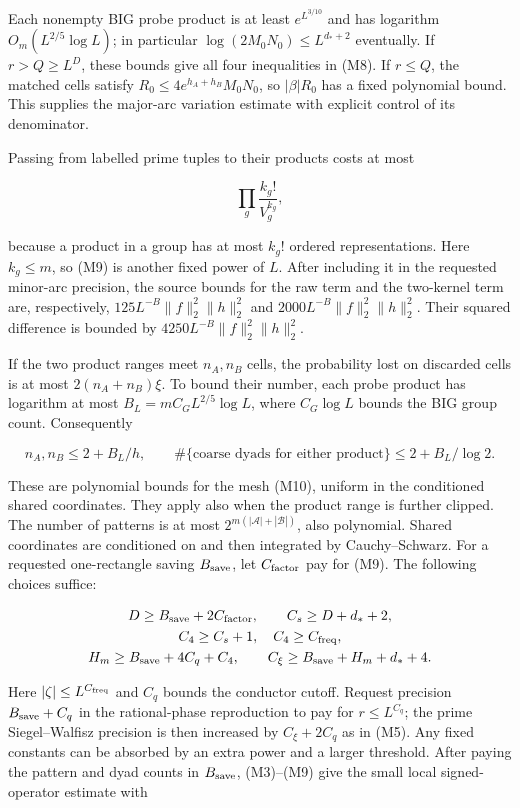 Each nonempty BIG probe product is at least \(e^{L^{3/10}}\) and has
logarithm \(O_m(L^{2/5}\log L)\); in particular
\(\log(2M_0N_0)\le L^{d_*+2}\) eventually. If \(r>Q\ge L^D\), these
bounds give all four inequalities in (M8). If \(r\le Q\), the matched
cells satisfy \(R_0\le4e^{h_A+h_B}M_0N_0\), so \(|\beta|R_0\) has a
fixed polynomial bound. This supplies the major-arc variation estimate
with explicit control of its denominator.

Passing from labelled prime tuples to their products costs at most

\[
\prod_g\frac{k_g!}{V_g^{k_g}}, \tag{M9}
\]

because a product in a group has at most \(k_g!\) ordered
representations. Here \(k_g\le m\), so (M9) is another fixed power of
\(L\). After including it in the requested minor-arc precision, the
source bounds for the raw term and the two-kernel term are,
respectively, \(125L^{-B}\|f\|_2^2\|h\|_2^2\) and
\(2000L^{-B}\|f\|_2^2\|h\|_2^2\). Their squared difference is bounded by
\(4250L^{-B}\|f\|_2^2\|h\|_2^2\).

If the two product ranges meet \(n_A,n_B\) cells, the probability lost
on discarded cells is at most \(2(n_A+n_B)\xi\). To bound their number,
each probe product has logarithm at most \(B_L=mC_G L^{2/5}\log L\),
where \(C_G\log L\) bounds the BIG group count. Consequently

\[
n_A,n_B\le2+B_L/h,\qquad
\#\{\text{coarse dyads for either product}\}
 \le2+B_L/\log2.
\tag{M9a}
\]

These are polynomial bounds for the mesh (M10), uniform in the
conditioned shared coordinates. They apply also when the product range
is further clipped. The number of patterns is at most
\(2^{m(|\mathcal A|+|\mathcal B|)}\), also polynomial. Shared
coordinates are conditioned on and then integrated by Cauchy--Schwarz.
For a requested one-rectangle saving \(B_{\rm save}\), let
\(C_{\rm factor}\) pay for (M9). The following choices suffice:

\[
\begin{gathered}
D\ge B_{\rm save}+2C_{\rm factor},\qquad
C_s\ge D+d_*+2,\\
C_4\ge C_s+1,\quad C_4\ge C_{\rm freq},\\
H_m\ge B_{\rm save}+4C_q+C_4,\qquad
C_\xi\ge B_{\rm save}+H_m+d_*+4.
\end{gathered}
\]

Here \(|\zeta|\le L^{C_{\rm freq}}\) and \(C_q\) bounds the conductor
cutoff. Request precision \(B_{\rm save}+C_q\) in the rational-phase
reproduction to pay for \(r\le L^{C_q}\); the prime Siegel--Walfisz
precision is then increased by \(C_\xi+2C_q\) as in (M5). Any fixed
constants can be absorbed by an extra power and a larger threshold.
After paying the pattern and dyad counts in \(B_{\rm save}\), (M3)--(M9)
give the small local signed-operator estimate with

